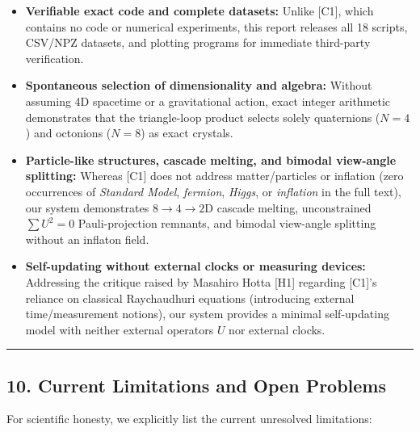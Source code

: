 \documentclass[
  a4paper,
]{article}
\providecommand{\tightlist}{%
  \setlength{\itemsep}{0pt}\setlength{\parskip}{0pt}}
\begin{document}
\begin{enumerate}
  \begin{itemize}
  \tightlist
  \item
    \textbf{Verifiable exact code and complete datasets:} Unlike
    {[}C1{]}, which contains no code or numerical experiments, this
    report releases all 18 scripts, CSV/NPZ datasets, and plotting
    programs for immediate third-party verification.
  \item
    \textbf{Spontaneous selection of dimensionality and algebra:}
    Without assuming 4D spacetime or a gravitational action, exact
    integer arithmetic demonstrates that the triangle-loop product
    selects solely quaternions (\(N=4\)) and octonions (\(N=8\)) as
    exact crystals.
  \item
    \textbf{Particle-like structures, cascade melting, and bimodal
    view-angle splitting:} Whereas {[}C1{]} does not address
    matter/particles or inflation (zero occurrences of \emph{Standard
    Model}, \emph{fermion}, \emph{Higgs}, or \emph{inflation} in the
    full text), our system demonstrates \(8 \to 4 \to 2\)D cascade
    melting, unconstrained \(\sum U^2 = 0\) Pauli-projection remnants,
    and bimodal view-angle splitting without an inflaton field.
  \item
    \textbf{Self-updating without external clocks or measuring devices:}
    Addressing the critique raised by Masahiro Hotta {[}H1{]} regarding
    {[}C1{]}'s reliance on classical Raychaudhuri equations (introducing
    external time/measurement notions), our system provides a minimal
    self-updating model with neither external operators \(U\) nor
    external clocks.
  \end{itemize}
\end{enumerate}

\begin{center}\rule{0.5\linewidth}{0.5pt}\end{center}

\subsection{10. Current Limitations and Open
Problems}\label{current-limitations-and-open-problems}

For scientific honesty, we explicitly list the current unresolved
limitations:
\end{document}
